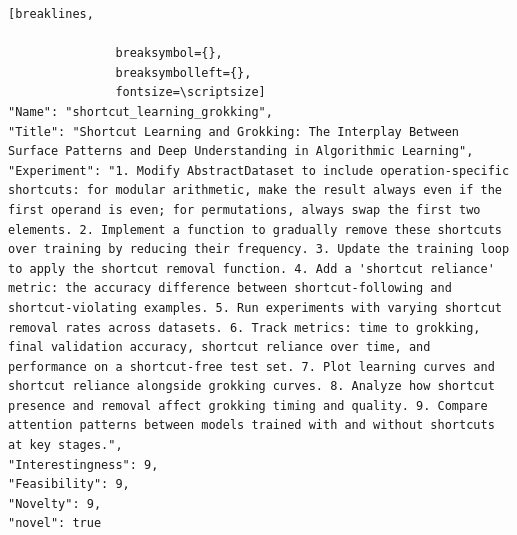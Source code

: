 \begin{tcolorbox}[
  breakable,
  colback  = blue!5!white,
  colframe = blue!75!black,
  title    = {Idea 49/50 - \texttt{shortcut\_learning\_grokking}},
  fontupper=\scriptsize\ttfamily,
]
\begin{Verbatim}[breaklines,

               breaksymbol={},
               breaksymbolleft={},
               fontsize=\scriptsize]
"Name": "shortcut_learning_grokking",
"Title": "Shortcut Learning and Grokking: The Interplay Between Surface Patterns and Deep Understanding in Algorithmic Learning",
"Experiment": "1. Modify AbstractDataset to include operation-specific shortcuts: for modular arithmetic, make the result always even if the first operand is even; for permutations, always swap the first two elements. 2. Implement a function to gradually remove these shortcuts over training by reducing their frequency. 3. Update the training loop to apply the shortcut removal function. 4. Add a 'shortcut reliance' metric: the accuracy difference between shortcut-following and shortcut-violating examples. 5. Run experiments with varying shortcut removal rates across datasets. 6. Track metrics: time to grokking, final validation accuracy, shortcut reliance over time, and performance on a shortcut-free test set. 7. Plot learning curves and shortcut reliance alongside grokking curves. 8. Analyze how shortcut presence and removal affect grokking timing and quality. 9. Compare attention patterns between models trained with and without shortcuts at key stages.",
"Interestingness": 9,
"Feasibility": 9,
"Novelty": 9,
"novel": true
\end{Verbatim}
\end{tcolorbox}

